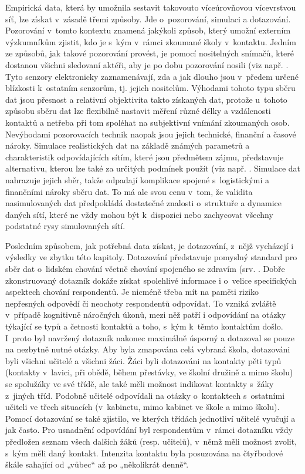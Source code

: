 Empirická data, která by umožnila sestavit takovouto víceúrovňovou vícevrstvou síť, lze získat v~zásadě třemi způsoby. Jde o~pozorování, simulaci a dotazování. Pozorování v~tomto kontextu znamená jakýkoli způsob, který umožní externím výzkumníkům zjistit, kdo je s~kým v~rámci zkoumané školy v~kontaktu. Jedním ze způsobů, jak takové pozorování provést, je pomocí nositelných snímačů, které dostanou všichni sledovaní aktéři, aby je po dobu pozorování nosili (viz např. \cite{stehle2011high, gemmetto2014mitigation}. Tyto senzory elektronicky zaznamenávají, zda a jak dlouho jsou v~předem určené blízkosti k~ostatním senzorům, tj. jejich nositelům. Výhodami tohoto typu sběru dat jsou přesnost a relativní objektivita takto získaných dat, protože u~tohoto způsobu sběru dat lze flexibilně nastavit měření různé délky a vzdálenosti kontaktů a netřeba při tom spoléhat na subjektivní vnímání zkoumaných osob. Nevýhodami pozorovacích technik naopak jsou jejich technické, finanční a časové nároky. Simulace realistických dat na základě známých parametrů a charakteristik odpovídajících sítím, které jsou předmětem zájmu, představuje alternativu, kterou lze také za určitých podmínek použít (viz např. \cite{mcgee2021model, potter2012estimating}. Simulace dat nahrazuje jejich sběr, takže odpadají komplikace spojené s~logistickými a finančními nároky sběru dat. To má ale svou cenu v~tom, že validita nasimulovaných dat předpokládá dostatečné znalosti o~struktuře a dynamice daných sítí, které ne vždy mohou být k~dispozici nebo zachycovat všechny podstatné rysy simulovaných sítí.

Posledním způsobem, jak potřebná data získat, je dotazování, z~nějž vycházejí i výsledky ve zbytku této kapitoly. Dotazování představuje pomyslný standard pro sběr dat o~lidském chování včetně chování spojeného se zdravím (srv. \cite{danon2011networks, luke2007network, zaj:mossong2008social}. Dobře zkonstruovaný dotazník dokáže získat spolehlivé informace i o~velice specifických aspektech chování respondentů. Je nicméně třeba mít na paměti riziko nepřesných odpovědí či neochoty respondentů odpovídat. To vzniká zvláště v~případě kognitivně náročných úkonů, mezi něž patří i odpovídání na otázky týkající se typů a četnosti kontaktů a toho, s~kým k~těmto kontaktům došlo. I~proto byl navržený dotazník nakonec maximálně úsporný a dotazoval se pouze na nezbytně nutné otázky. Aby byla zmapována celá vybraná škola, dotazováni byli všichni učitelé a všichni žáci. Žáci byli dotazováni na kontakty pěti typů (kontakty v~lavici, při obědě, během přestávky, ve školní družině a mimo školu) se spolužáky ve své třídě, ale také měli možnost indikovat kontakty s~žáky z~jiných tříd. Podobně učitelé odpovídali na otázky o~kontaktech s~ostatními učiteli ve třech situacích (v~kabinetu, mimo kabinet ve škole a mimo školu). Pomocí dotazování se také zjistilo, ve kterých třídách jednotliví učitelé vyučují a jak často. Pro usnadnění odpovídání byl respondentům v~rámci dotazníku vždy předložen seznam všech dalších žáků (resp. učitelů), v~němž měli možnost zvolit, s~kým měli daný kontakt. Intenzita kontaktu byla posuzována na čtyřbodové škále sahající od „vůbec“ až po „několikrát denně“.


